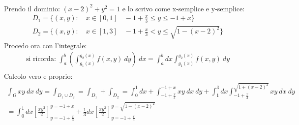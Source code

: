 \documentclass[a4paper, oneside]{article}
\begin{document}
\begin{figure}
    \centering
\end{figure}
    \hfil\\
    Prendo il dominio: $(x-2)^2+y^2=1$ e lo scrivo come x-semplice e y-semplice:
    \begin{gather*}
        D_1 = \{ (x,y): \quad x \in [0,1] \quad -1+\frac{x}{3} \leq y \leq -1 +x\}\\
        D_2 = \{ (x,y): \quad x \in[1,3] \quad -1+\frac{x}{3} < y \leq \sqrt{1 - (x-2)^2} \}
    \end{gather*}
    Procedo ora con l'integrale:
    \begin{gather*}
        \text{si ricorda: } \int_{a}^{b} \left( \int_{g_1(x)}^{g_2(x)} f(x,y) \ dy \right) \ dx = \int_{a}^{b} dx \int_{g_1(x)}^{g_2(x)} f(x,y) \ dy \\
    \end{gather*}
    Calcolo vero e proprio:
    \begin{gather*}
        \int_{\Omega} xy \ dx \ dy = \int_{D_1 \cup D_2}  = \int_{D_1} + \int_{D_2} = \int_{0}^{1} dx + \int_{-1 + \frac{x}{3}}^{-1+x} xy \ dx \ dy + \int_{1}^{3} dx \int_{-1+\frac{x}{3}}^{\sqrt{1+(x-2)^2}} xy \ dx \ dy\\
        = \int_{0}^{1} dx \left[ \frac{xy^2}{2} \right]^{y=-1+x}_{y=-1+\frac{x}{3}} + \frac{1}{3} dx \left[ \frac{xy^2}{2} \right]^{y= \sqrt{1-(x-2)^2}}_{y=-1+\frac{x}{3}}  
    \end{gather*}
\end{document}
